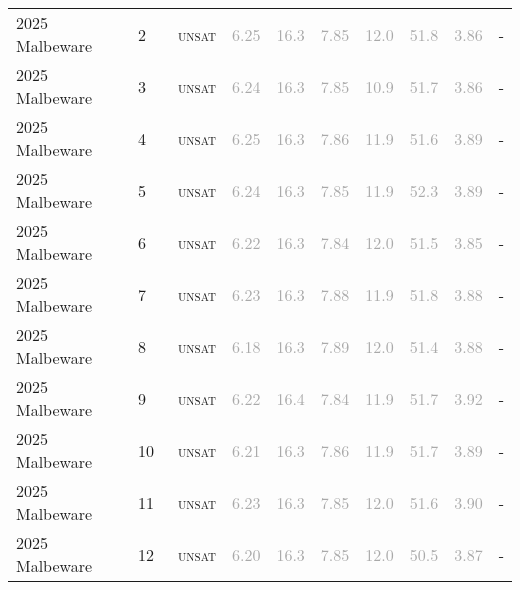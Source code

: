 \begin{center}
{\begin{longtable}{@{}llllllllll@{}}
2025 Malbeware & 2 & ~\textsc{unsat} & \textcolor{darkgray}{6.25} & \textcolor{darkgray}{16.3} & \textcolor{darkgray}{7.85} & \textcolor{darkgray}{12.0} & \textcolor{darkgray}{51.8} & \textcolor{darkgray}{3.86} & - \\
2025 Malbeware & 3 & ~\textsc{unsat} & \textcolor{darkgray}{6.24} & \textcolor{darkgray}{16.3} & \textcolor{darkgray}{7.85} & \textcolor{darkgray}{10.9} & \textcolor{darkgray}{51.7} & \textcolor{darkgray}{3.86} & - \\
2025 Malbeware & 4 & ~\textsc{unsat} & \textcolor{darkgray}{6.25} & \textcolor{darkgray}{16.3} & \textcolor{darkgray}{7.86} & \textcolor{darkgray}{11.9} & \textcolor{darkgray}{51.6} & \textcolor{darkgray}{3.89} & - \\
2025 Malbeware & 5 & ~\textsc{unsat} & \textcolor{darkgray}{6.24} & \textcolor{darkgray}{16.3} & \textcolor{darkgray}{7.85} & \textcolor{darkgray}{11.9} & \textcolor{darkgray}{52.3} & \textcolor{darkgray}{3.89} & - \\
2025 Malbeware & 6 & ~\textsc{unsat} & \textcolor{darkgray}{6.22} & \textcolor{darkgray}{16.3} & \textcolor{darkgray}{7.84} & \textcolor{darkgray}{12.0} & \textcolor{darkgray}{51.5} & \textcolor{darkgray}{3.85} & - \\
2025 Malbeware & 7 & ~\textsc{unsat} & \textcolor{darkgray}{6.23} & \textcolor{darkgray}{16.3} & \textcolor{darkgray}{7.88} & \textcolor{darkgray}{11.9} & \textcolor{darkgray}{51.8} & \textcolor{darkgray}{3.88} & - \\
2025 Malbeware & 8 & ~\textsc{unsat} & \textcolor{darkgray}{6.18} & \textcolor{darkgray}{16.3} & \textcolor{darkgray}{7.89} & \textcolor{darkgray}{12.0} & \textcolor{darkgray}{51.4} & \textcolor{darkgray}{3.88} & - \\
2025 Malbeware & 9 & ~\textsc{unsat} & \textcolor{darkgray}{6.22} & \textcolor{darkgray}{16.4} & \textcolor{darkgray}{7.84} & \textcolor{darkgray}{11.9} & \textcolor{darkgray}{51.7} & \textcolor{darkgray}{3.92} & - \\
2025 Malbeware & 10 & ~\textsc{unsat} & \textcolor{darkgray}{6.21} & \textcolor{darkgray}{16.3} & \textcolor{darkgray}{7.86} & \textcolor{darkgray}{11.9} & \textcolor{darkgray}{51.7} & \textcolor{darkgray}{3.89} & - \\
2025 Malbeware & 11 & ~\textsc{unsat} & \textcolor{darkgray}{6.23} & \textcolor{darkgray}{16.3} & \textcolor{darkgray}{7.85} & \textcolor{darkgray}{12.0} & \textcolor{darkgray}{51.6} & \textcolor{darkgray}{3.90} & - \\
2025 Malbeware & 12 & ~\textsc{unsat} & \textcolor{darkgray}{6.20} & \textcolor{darkgray}{16.3} & \textcolor{darkgray}{7.85} & \textcolor{darkgray}{12.0} & \textcolor{darkgray}{50.5} & \textcolor{darkgray}{3.87} & - \\

\end{longtable}}
\end{center}
